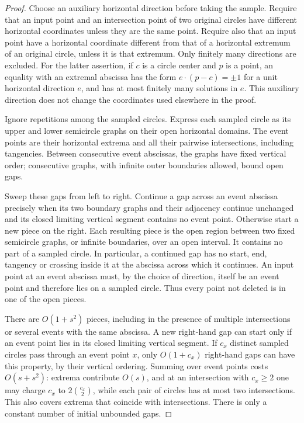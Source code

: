 \begin{proof}
Choose an auxiliary horizontal direction before taking the sample.
Require that an input point and an intersection point of two original
circles have different horizontal coordinates unless they are the same
point. Require also that an input point have a horizontal coordinate
different from that of a horizontal extremum of an original circle,
unless it is that extremum. Only finitely many directions are excluded.
For the latter assertion, if \(c\) is a circle center and \(p\) is a
point, an equality with an extremal abscissa has the form
\(e\cdot(p-c)=\pm1\) for a unit horizontal direction \(e\), and has
at most finitely many solutions in \(e\). This auxiliary direction
does not change the coordinates used elsewhere in the proof.

Ignore repetitions among the sampled circles. Express each sampled
circle as its upper and lower semicircle graphs on their open horizontal
domains. The event points are their horizontal extrema and all their
pairwise intersections, including tangencies. Between consecutive event
abscissas, the graphs have fixed vertical order; consecutive graphs,
with infinite outer boundaries allowed, bound open gaps.

Sweep these gaps from left to right. Continue a gap across an event
abscissa precisely when its two boundary graphs and their adjacency
continue unchanged and its closed limiting vertical segment contains no
event point. Otherwise start a new piece on the right. Each resulting
piece is the open region between two fixed semicircle graphs, or infinite
boundaries, over an open interval. It contains no part of a sampled
circle. In particular, a continued gap has no start, end, tangency or
crossing inside it at the abscissa across which it continues. An input
point at an event abscissa must, by the choice of direction, itself be an
event point and therefore lies on a sampled circle. Thus every point not
deleted is in one of the open pieces.

There are \(O(1+s^2)\) pieces, including in the presence of multiple
intersections or several events with the same abscissa. A new right-hand
gap can start only if an event point lies in its closed limiting vertical
segment. If \(c_x\) distinct sampled circles pass through an event point
\(x\), only \(O(1+c_x)\) right-hand gaps can have this property, by
their vertical ordering. Summing over event points costs \(O(s+s^2)\):
extrema contribute \(O(s)\), and at an intersection with \(c_x\ge2\)
one may charge \(c_x\) to \(2\binom{c_x}{2}\), while each pair of
circles has at most two intersections. This also covers extrema that
coincide with intersections. There is only a constant number of initial
unbounded gaps.


\end{proof}
